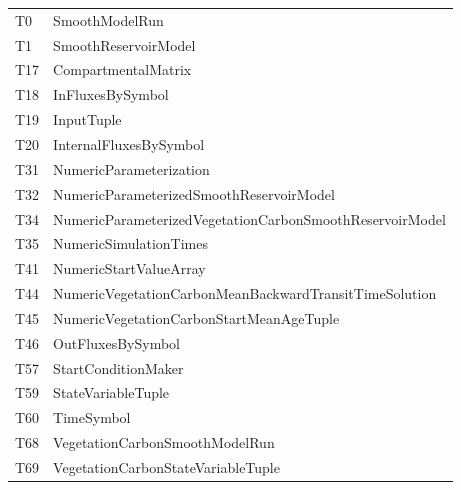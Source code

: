 \begin{tabular}{l l}
	T0 	 & 	SmoothModelRun\\
	T1 	 & 	SmoothReservoirModel\\
	T17 	 & 	CompartmentalMatrix\\
	T18 	 & 	InFluxesBySymbol\\
	T19 	 & 	InputTuple\\
	T20 	 & 	InternalFluxesBySymbol\\
	T31 	 & 	NumericParameterization\\
	T32 	 & 	NumericParameterizedSmoothReservoirModel\\
	T34 	 & 	NumericParameterizedVegetationCarbonSmoothReservoirModel\\
	T35 	 & 	NumericSimulationTimes\\
	T41 	 & 	NumericStartValueArray\\
	T44 	 & 	NumericVegetationCarbonMeanBackwardTransitTimeSolution\\
	T45 	 & 	NumericVegetationCarbonStartMeanAgeTuple\\
	T46 	 & 	OutFluxesBySymbol\\
	T57 	 & 	StartConditionMaker\\
	T59 	 & 	StateVariableTuple\\
	T60 	 & 	TimeSymbol\\
	T68 	 & 	VegetationCarbonSmoothModelRun\\
	T69 	 & 	VegetationCarbonStateVariableTuple
\end{tabular}